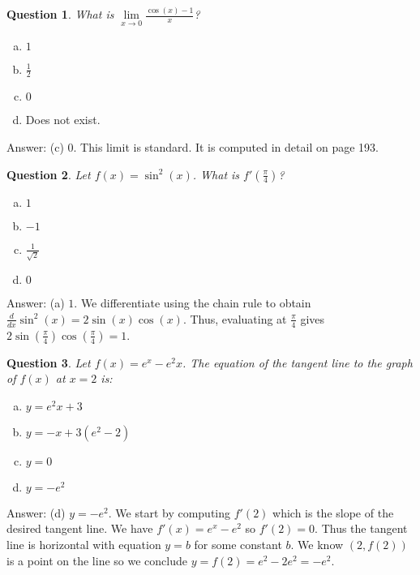 \documentclass[10pt]{article}
\newtheorem{quiz}{Question}
\begin{document}
 \begin{multicols}{2}

\begin{quiz} What is $\lim\limits_{x\to 0} \frac{\cos(x)-1}{x}$?
\end{quiz}
\begin {enumerate}[(a)]
\item $1$
\item $\frac{1}{2}$
\item $0$
\item Does not exist.
\end{enumerate}
\vspace{0.5 cm}

Answer: (c) 0. This limit is standard. It is computed in detail on page 193.

\vspace{5mm}

\begin{quiz} Let $f(x) = \sin^2 (x)$. What is $f'(\frac{ \pi}{4})$?
\end{quiz}
\begin {enumerate}[(a)]
\item $1$
\item $-1$
\item $\frac{1}{\sqrt{2}}$
\item $0$
\end{enumerate}
\vspace{0.5 cm}

Answer: (a) $1$. We differentiate using the chain rule to obtain $\frac{d}{dx}\sin^2(x) = 2\sin(x)\cos(x)$. Thus, evaluating at $\frac{\pi}{4}$ gives $2\sin(\frac{\pi}{4})\cos(\frac{\pi}{4}) = 1$.

\vfill
\columnbreak

\begin{quiz}Let $f(x) =  e^x - e^2 x$. The equation of the tangent line to the graph of $f(x)$ at $x = 2$ is:
\end{quiz}
\begin {enumerate}[(a)]
\item $y= e^2 x + 3$
\item $y = -x + 3(e^2-2)$
\item $y = 0$
\item $y = -e^2$
\end{enumerate}

\vspace{5mm}

Answer: (d) $y = -e^2$. We start by computing $f'(2)$ which is the slope of the desired tangent line. We have $f'(x) = e^x - e^2$ so $f'(2) = 0$. Thus the tangent line is horizontal with equation $y = b$ for some constant $b$. We know $(2, f(2))$ is a point on the line so we conclude $y = f(2) =e^2 - 2e^2 = -e^2$.


\end{multicols}
\end{document}
